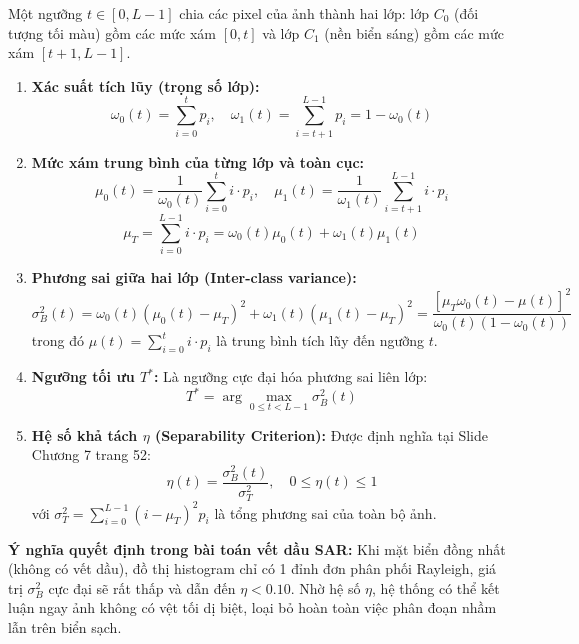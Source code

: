 Một ngưỡng $t \in [0, L-1]$ chia các pixel của ảnh thành hai lớp: lớp $C_0$ (đối tượng tối màu) gồm các mức xám $[0, t]$ và lớp $C_1$ (nền biển sáng) gồm các mức xám $[t+1, L-1]$.
\begin{enumerate}
    \item \textbf{Xác suất tích lũy (trọng số lớp):}
    \begin{equation}
        \omega_0(t) = \sum_{i=0}^t p_i, \quad \omega_1(t) = \sum_{i=t+1}^{L-1} p_i = 1 - \omega_0(t)
    \end{equation}
    \item \textbf{Mức xám trung bình của từng lớp và toàn cục:}
    \begin{equation}
        \mu_0(t) = \frac{1}{\omega_0(t)} \sum_{i=0}^t i \cdot p_i, \quad \mu_1(t) = \frac{1}{\omega_1(t)} \sum_{i=t+1}^{L-1} i \cdot p_i
    \end{equation}
    \begin{equation}
        \mu_T = \sum_{i=0}^{L-1} i \cdot p_i = \omega_0(t) \mu_0(t) + \omega_1(t) \mu_1(t)
    \end{equation}
    \item \textbf{Phương sai giữa hai lớp (Inter-class variance):}
    \begin{equation}
        \sigma_B^2(t) = \omega_0(t)(\mu_0(t) - \mu_T)^2 + \omega_1(t)(\mu_1(t) - \mu_T)^2 = \frac{[\mu_T \omega_0(t) - \mu(t)]^2}{\omega_0(t)(1 - \omega_0(t))}
        \label{eq:sigma_b}
    \end{equation}
    trong đó $\mu(t) = \sum_{i=0}^t i \cdot p_i$ là trung bình tích lũy đến ngưỡng $t$.
    \item \textbf{Ngưỡng tối ưu $T^*$:} Là ngưỡng cực đại hóa phương sai liên lớp:
    \begin{equation}
        T^* = \arg\max_{0 \le t < L-1} \sigma_B^2(t)
    \end{equation}
    \item \textbf{Hệ số khả tách $\eta$ (Separability Criterion):} Được định nghĩa tại Slide Chương 7 trang 52:
    \begin{equation}
        \eta(t) = \frac{\sigma_B^2(t)}{\sigma_T^2}, \quad 0 \le \eta(t) \le 1
        \label{eq:separability}
    \end{equation}
    với $\sigma_T^2 = \sum_{i=0}^{L-1} (i - \mu_T)^2 p_i$ là tổng phương sai của toàn bộ ảnh.
\end{enumerate}

\textbf{Ý nghĩa quyết định trong bài toán vết dầu SAR:} Khi mặt biển đồng nhất (không có vết dầu), đồ thị histogram chỉ có 1 đỉnh đơn phân phối Rayleigh, giá trị $\sigma_B^2$ cực đại sẽ rất thấp và dẫn đến $\eta < 0.10$. Nhờ hệ số $\eta$, hệ thống có thể kết luận ngay ảnh không có vệt tối dị biệt, loại bỏ hoàn toàn việc phân đoạn nhầm lẫn trên biển sạch.

